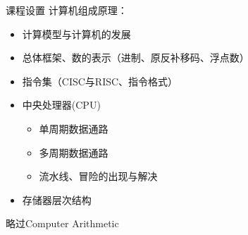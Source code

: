 \documentclass[UTF8]{ctexbeamer}
\begin{document}
\begin{frame}{课程设置}
计算机组成原理：
\begin{itemize}
	\item 计算模型与计算机的发展
	\item 总体框架、数的表示（进制、原反补移码、浮点数）
	\item 指令集（CISC与RISC、指令格式）%
	\item 中央处理器(CPU)
	\begin{itemize}
		\item 单周期数据通路
		\item 多周期数据通路
		\item 流水线、冒险的出现与解决
	\end{itemize}
	\item 存储器层次结构
\end{itemize}
略过Computer Arithmetic
\end{frame}
\end{document}
